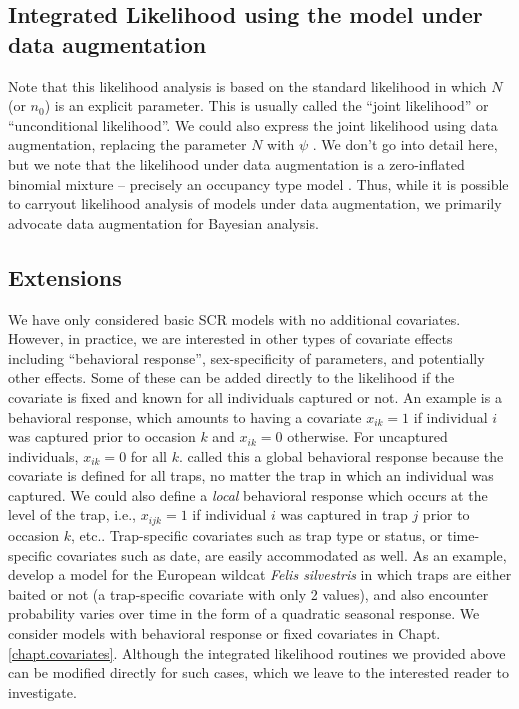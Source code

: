 \subsection{Integrated Likelihood using the model under data augmentation } 

Note that this likelihood analysis is based on the standard likelihood
in which $N$ (or $n_{0}$) is an explicit parameter. This is usually called
the ``joint likelihood'' or ``unconditional likelihood''.  We could also
express the joint likelihood using data augmentation, replacing the
parameter $N$ with $\psi$ \citep[e.g., see Sec. 7.1.6][for an example]{royle_dorazio:2008}.
We don't go into detail here, but we note that the
likelihood under data augmentation is a zero-inflated binomial
mixture – precisely an occupancy type model \citep{royle:2006}.
Thus, while it is possible to carryout likelihood analysis of
models under data augmentation, we primarily advocate data
augmentation for Bayesian analysis.


\subsection{ Extensions}

We have only considered basic SCR models with no additional
covariates. However, in practice, we are interested in other types of
covariate effects including ``behavioral response'', 
sex-specificity of parameters, and potentially other effects. Some of
these  can be added directly to the likelihood if the covariate is fixed
and known for all individuals captured or not. An example is a
behavioral response, which amounts to having a covariate $x_{ik}=1$ if
individual $i$ was captured prior to occasion $k$ and $x_{ik}=0$
otherwise. For uncaptured individuals, $x_{ik}=0$ for all $k$.
 \citet{royle_etal:2011jwm} called this a global behavioral
response because the covariate is defined for all traps, no matter the
trap in which an individual was captured. We could also define a {\it
  local} behavioral response which occurs at the level of the trap,
i.e., $x_{ijk}=1$ if individual $i$ was captured in trap $j$ prior to
occasion $k$, etc.. 
Trap-specific covariates such as trap type or status, or
time-specific covariates such as date, are easily accommodated as
well. As an example, \citet{kery_etal:2010} develop a model for the
European wildcat \emph{Felis silvestris}  in which traps are either baited or not (a
trap-specific covariate with only 2 values), and also encounter
probability varies over time in the form of a quadratic seasonal response.
We consider models with behavioral response or fixed covariates in
Chapt. \ref{chapt.covariates}.
Although the integrated likelihood routines we provided above can be
modified directly for such cases, which we leave to the interested
reader to investigate. 

